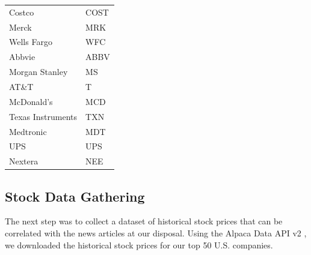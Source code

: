\documentclass[conference]{IEEEtran}
\begin{document}
\begin{table}[ht]
\begin{tabular}{|l|l|}
    Costco & COST \\
    Merck & MRK \\
    Wells Fargo & WFC \\
    Abbvie & ABBV \\
    Morgan Stanley & MS \\
    AT\&T & T \\
    McDonald's & MCD \\
    Texas Instruments & TXN \\
    Medtronic & MDT \\
    UPS & UPS \\
    Nextera & NEE \\
    \hline
\end{tabular}
\label{table:stockSources}
\end{table}
\subsection{Stock Data Gathering}
The next step was to collect a dataset of historical stock prices that can be correlated with the news articles at our disposal. Using the Alpaca Data API v2 \cite{alpacadataapi}, we downloaded the historical stock prices for our top 50 U.S. companies. 
\end{document}
